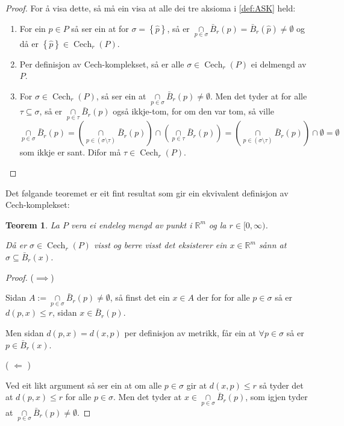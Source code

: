 \documentclass[a4paper, 12pt, norsk]{article}
\theoremstyle{plain}
\newtheorem{theorem}{Teorem}[section]
\theoremstyle{definition}
\newcommand{\Rb}{\mathbb{R}}
\newcommand{\intersect}{ \mathop{\cap}\limits }
\newcommand{\set}[1]{ \left\{ #1 \right\} } %
\DeclareMathOperator{\Cech}{Cech} %
\begin{document}
\begin{proof}
	For å visa dette, så må ein visa at alle dei tre aksioma i \autoref{def:ASK} held:
	\begin{enumerate}
		\item{ For ein \( \hat{p} \in P \) så ser ein at for \( \sigma = \set{\hat{p}} \), så er \( \intersect_{p\in\sigma}\bar{B}_r(p)=\bar{B}_r(\hat{p})\neq\emptyset \) og då er \( \set{\hat{p}} \in \Cech_r(P) \). }
		\item{ Per definisjon av Cech-komplekset, så er alle \( \sigma \in \Cech_r(P) \) ei delmengd av \( P \). }
		\item{ For \( \sigma \in \Cech_r(P) \), så ser ein at \( \intersect_{p\in\sigma} \bar{B}_r(p) \neq \emptyset \). Men det tyder at for alle \( \tau \subseteq \sigma \), så er \( \intersect_{p\in\tau} \bar{B}_r(p) \) også ikkje-tom, for om den var tom, så ville
			\[ 
				\intersect_{p\in\sigma} \bar{B}_r(p) = \left( \intersect_{p\in(\sigma\setminus\tau)} \bar{B}_r(p) \right) \intersect \left( \intersect_{p\in\tau} \bar{B}_r(p) \right) = \left( \intersect_{p\in(\sigma\setminus\tau)} \bar{B}_r(p) \right) \intersect \emptyset = \emptyset 
			\] 
			som ikkje er sant. Difor må \( \tau \in \Cech_r(P) \). \qedhere}
	\end{enumerate}
\end{proof}

Det følgande teoremet er eit fint resultat som gir ein ekvivalent definisjon av Cech-komplekset:

\begin{theorem}
	La $P$ vera ei endeleg mengd av punkt i $\Rb^m$ og la $r\in[0, \infty)$.

	Då er \( \sigma \in \Cech_r(P) \) visst og berre visst det eksisterer ein \( x \in \Rb^m \) sånn at \( \sigma \subseteq \bar{B}_r(x) \).
\end{theorem}

\begin{proof}
	($\implies$)
	
	Sidan $A:=\intersect_{p\in\sigma}\bar{B}_r(p)\neq\emptyset$, så finst det ein $x\in A$ der for for alle \( p\in\sigma \) så er \( d(p,x)\leq r \), sidan $x\in\bar{B}_r(p)$.
	
	Men sidan $d(p,x)=d(x,p)$ per definisjon av metrikk, får ein at \( \forall p\in\sigma \) så er \( p \in \bar{B}_r(x) \).
	
	( \( \Longleftarrow \) )
	
	Ved eit likt argument så ser ein at om alle \( p \in \sigma \) gir at \( d(x, p) \leq r \) så tyder det at \( d(p, x) \leq r \) for alle \( p \in \sigma \). Men det tyder at \( x \in \intersect_{p \in \sigma} \bar{B}_r(p) \), som igjen tyder at \( \intersect_{p \in \sigma} \bar{B}_r(p) \neq \emptyset \).
\end{proof}
\end{document}
